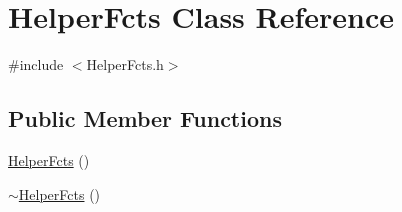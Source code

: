 \hypertarget{classHelperFcts}{\section{\-Helper\-Fcts \-Class \-Reference}
\label{classHelperFcts}
}


{\ttfamily \#include $<$\-Helper\-Fcts.\-h$>$}

\subsection*{\-Public \-Member \-Functions}
\begin{DoxyCompactItemize}
\item 
\hyperlink{classHelperFcts_a2077e86e8be5241c948108f3d128659a}{\-Helper\-Fcts} ()
\item 
\hyperlink{classHelperFcts_af4bf4fc5be60e0dd14b54a308b38fee9}{$\sim$\-Helper\-Fcts} ()
\end{DoxyCompactItemize}

